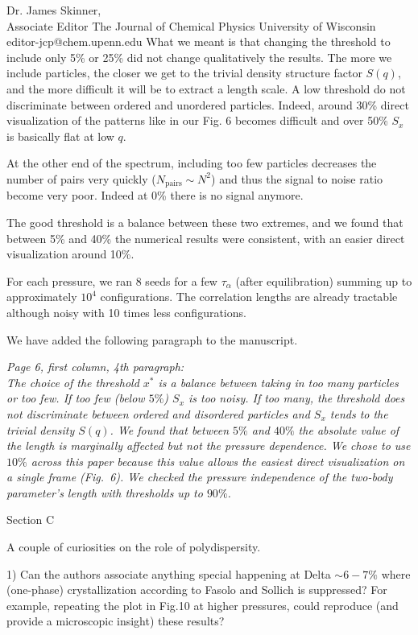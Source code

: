 \documentclass[a4paper, rebuttal, parskip=true, firsthead=false, fromemail=false, foldmarks=false]{scrlttr2}
\begin{document}
\begin{letter}{Dr. James Skinner,\\Associate Editor
The Journal of Chemical Physics
University of Wisconsin\\
editor-jcp@chem.upenn.edu }
What we meant is that changing the threshold to include only 5\% or 25\% did not change qualitatively the results. The more we include particles, the closer we get to the trivial density structure factor $S(q)$, and the more difficult it will be to extract a length scale. A low threshold do not discriminate between ordered and unordered particles. Indeed, around 30\% direct visualization of the patterns like in our Fig. 6 becomes difficult and over 50\% $S_x$ is basically flat at low $q$. 

At the other end of the spectrum, including too few particles decreases the number of pairs very quickly ($N_\text{pairs}\sim N^2$) and thus the signal to noise ratio become very poor. Indeed at 0\% there is no signal anymore.

The good threshold is a balance between these two extremes, and we found that between 5\% and 40\% the numerical results were consistent, with an easier direct visualization around 10\%.

For each pressure, we ran 8 seeds for a few $\tau_\alpha$ (after equilibration) summing up to approximately $10^4$ configurations. The correlation lengths are already tractable although noisy with 10 times less configurations.

We have added the following paragraph to the manuscript.

{\it Page 6, first column, 4th paragraph:\\
The choice of the threshold $x^*$ is a balance between taking in too many particles or too few. If too few (below $5\%$) $S_x$ is too noisy. If too many, the threshold does not discriminate between ordered and disordered particles and $S_x$ tends to the trivial density $S(q)$. We found that between $5\%$ and $40\%$ the absolute value of the length is marginally affected but not the pressure dependence. We chose to use $10\%$ across this paper because this value allows the easiest direct visualization on a single frame (Fig.~6). We checked the pressure independence of the two-body parameter's length with thresholds up to $90\%$.
} 

\begin{quotationi}
Section C

A couple of curiosities on the role of polydispersity.

1) Can the authors associate anything special happening at Delta $\sim6-7\%$ where (one-phase) crystallization according to Fasolo and Sollich is suppressed? For example, repeating the plot in Fig.10 at higher pressures, could reproduce (and provide a microscopic insight) these results?
\end{quotationi}


\end{letter}
\end{document}
